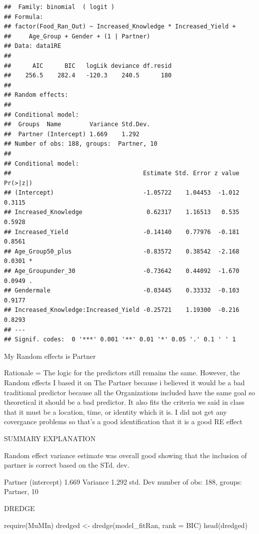 \documentclass[
]{article}
\newenvironment{Shaded}{\begin{snugshade}}{\end{snugshade}}
\newcommand{\AttributeTok}[1]{\textcolor[rgb]{0.77,0.63,0.00}{#1}}
\newcommand{\FunctionTok}[1]{\textcolor[rgb]{0.00,0.00,0.00}{#1}}
\newcommand{\NormalTok}[1]{#1}
\newcommand{\OtherTok}[1]{\textcolor[rgb]{0.56,0.35,0.01}{#1}}
\newcommand{\StringTok}[1]{\textcolor[rgb]{0.31,0.60,0.02}{#1}}
\begin{document}
\begin{verbatim}
##  Family: binomial  ( logit )
## Formula:          
## factor(Food_Ran_Out) ~ Increased_Knowledge * Increased_Yield +  
##     Age_Group + Gender + (1 | Partner)
## Data: data1RE
## 
##      AIC      BIC   logLik deviance df.resid 
##    256.5    282.4   -120.3    240.5      180 
## 
## Random effects:
## 
## Conditional model:
##  Groups  Name        Variance Std.Dev.
##  Partner (Intercept) 1.669    1.292   
## Number of obs: 188, groups:  Partner, 10
## 
## Conditional model:
##                                     Estimate Std. Error z value Pr(>|z|)  
## (Intercept)                         -1.05722    1.04453  -1.012   0.3115  
## Increased_Knowledge                  0.62317    1.16513   0.535   0.5928  
## Increased_Yield                     -0.14140    0.77976  -0.181   0.8561  
## Age_Group50_plus                    -0.83572    0.38542  -2.168   0.0301 *
## Age_Groupunder_30                   -0.73642    0.44092  -1.670   0.0949 .
## Gendermale                          -0.03445    0.33332  -0.103   0.9177  
## Increased_Knowledge:Increased_Yield -0.25721    1.19300  -0.216   0.8293  
## ---
## Signif. codes:  0 '***' 0.001 '**' 0.01 '*' 0.05 '.' 0.1 ' ' 1
\end{verbatim}

My Random effects is Partner

Rationale = The logic for the predictors still remains the same.
However, the Random effects I based it on The Partner because i believed
it would be a bad traditional predictor because all the Organizations
included have the same goal so theoretical it should be a bad predictor.
It also fits the criteria we said in class that it must be a location,
time, or identity which it is. I did not get any covergance problems so
that's a good identification that it is a good RE effect

SUMMARY EXPLANATION

Random effect variance estimate was overall good showing that the
inclusion of partner is correct based on the STd. dev.

Partner (intercept) 1.669 Variance 1.292 std. Dev number of obs: 188,
groups: Partner, 10

DREDGE

\begin{Shaded}
\begin{Highlighting}[]
\FunctionTok{require}\NormalTok{(MuMIn)}
\NormalTok{dredged }\OtherTok{\textless{}{-}} \FunctionTok{dredge}\NormalTok{(model\_fitRan, }\AttributeTok{rank =} \StringTok{\textquotesingle{}BIC\textquotesingle{}}\NormalTok{)}
\FunctionTok{head}\NormalTok{(dredged)}
\end{Highlighting}
\end{Shaded}
\end{document}
